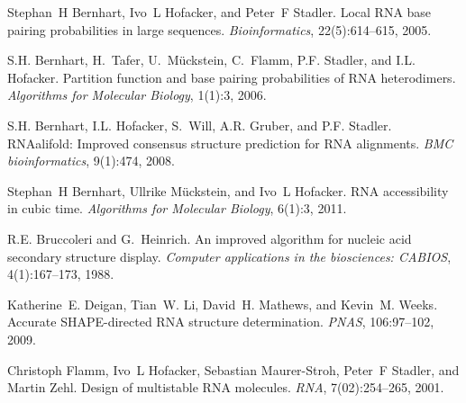 
\begin{DoxyDescription}
\item[\label{citelist_CITEREF_bernhart:2005}%
\Hypertarget{citelist_CITEREF_bernhart:2005}%
\mbox{[}1\mbox{]}]Stephan~H Bernhart, Ivo~L Hofacker, and Peter~F Stadler. Local R\+NA base pairing probabilities in large sequences. {\itshape Bioinformatics}, 22(5)\+:614--615, 2005.


\item[\label{citelist_CITEREF_bernhart:2006}%
\Hypertarget{citelist_CITEREF_bernhart:2006}%
\mbox{[}2\mbox{]}]S.\+H. Bernhart, H.~Tafer, U.~M\"{u}ckstein, C.~Flamm, P.\+F. Stadler, and I.\+L. Hofacker. Partition function and base pairing probabilities of R\+NA heterodimers. {\itshape Algorithms for Molecular Biology}, 1(1)\+:3, 2006.


\item[\label{citelist_CITEREF_bernhart:2008}%
\Hypertarget{citelist_CITEREF_bernhart:2008}%
\mbox{[}3\mbox{]}]S.\+H. Bernhart, I.\+L. Hofacker, S.~Will, A.\+R. Gruber, and P.\+F. Stadler. R\+N\+Aalifold\+: Improved consensus structure prediction for R\+NA alignments. {\itshape B\+MC bioinformatics}, 9(1)\+:474, 2008.


\item[\label{citelist_CITEREF_bernhart:2011}%
\Hypertarget{citelist_CITEREF_bernhart:2011}%
\mbox{[}4\mbox{]}]Stephan~H Bernhart, Ullrike M\"{u}ckstein, and Ivo~L Hofacker. R\+NA accessibility in cubic time. {\itshape Algorithms for Molecular Biology}, 6(1)\+:3, 2011.


\item[\label{citelist_CITEREF_bruccoleri:1988}%
\Hypertarget{citelist_CITEREF_bruccoleri:1988}%
\mbox{[}5\mbox{]}]R.\+E. Bruccoleri and G.~Heinrich. An improved algorithm for nucleic acid secondary structure display. {\itshape Computer applications in the biosciences\+: C\+A\+B\+I\+OS}, 4(1)\+:167--173, 1988.


\item[\label{citelist_CITEREF_deigan:2009}%
\Hypertarget{citelist_CITEREF_deigan:2009}%
\mbox{[}6\mbox{]}]Katherine~E. Deigan, Tian~W. Li, David~H. Mathews, and Kevin~M. Weeks. Accurate S\+H\+A\+P\+E-\/directed R\+NA structure determination. {\itshape P\+N\+AS}, 106\+:97--102, 2009.


\item[\label{citelist_CITEREF_flamm:2001}%
\Hypertarget{citelist_CITEREF_flamm:2001}%
\mbox{[}7\mbox{]}]Christoph Flamm, Ivo~L Hofacker, Sebastian Maurer-\/\+Stroh, Peter~F Stadler, and Martin Zehl. Design of multistable R\+NA molecules. {\itshape R\+NA}, 7(02)\+:254--265, 2001.



\end{DoxyDescription}

